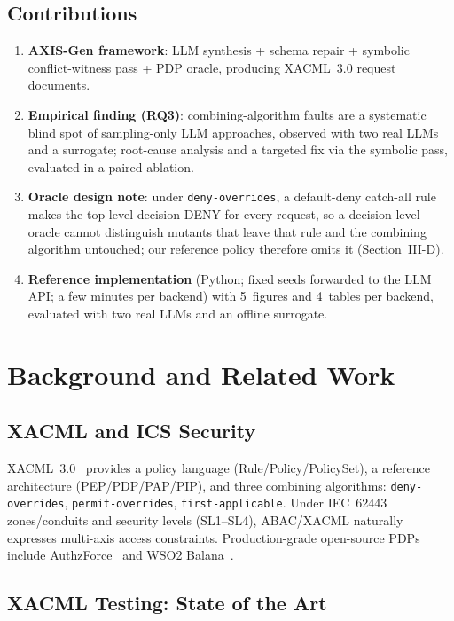 \documentclass[conference]{IEEEtran}
\begin{document}
\subsection{Contributions}

\begin{enumerate}
  \item \textbf{AXIS-Gen framework}: LLM synthesis + schema repair + symbolic
    conflict-witness pass + PDP oracle, producing XACML~3.0 request documents.
  \item \textbf{Empirical finding (RQ3)}: combining-algorithm faults are a
    systematic blind spot of sampling-only LLM approaches, observed with two
    real LLMs and a surrogate; root-cause analysis and a targeted fix via the
    symbolic pass, evaluated in a paired ablation.
  \item \textbf{Oracle design note}: under \texttt{deny-overrides}, a
    default-deny catch-all rule makes the top-level decision DENY for every
    request, so a decision-level oracle cannot distinguish mutants that leave
    that rule and the combining algorithm untouched; our reference policy
    therefore omits it (Section~III-D).
  \item \textbf{Reference implementation} (Python; fixed seeds forwarded to the
    LLM API; a few minutes per backend) with 5~figures and 4~tables per
    backend, evaluated with two real LLMs and an offline surrogate.
\end{enumerate}

\section{Background and Related Work}

\subsection{XACML and ICS Security}

XACML~3.0~\cite{b9} provides a policy language (Rule/Policy/PolicySet), a
reference architecture (PEP/PDP/PAP/PIP), and three combining algorithms:
\texttt{deny-overrides}, \texttt{permit-overrides}, \texttt{first-applicable}.
Under IEC~62443 zones/conduits and security levels (SL1--SL4), ABAC/XACML
naturally expresses multi-axis access constraints. Production-grade open-source
PDPs include AuthzForce~\cite{b17} and WSO2 Balana~\cite{b18}.

\subsection{XACML Testing: State of the Art}
\end{document}
